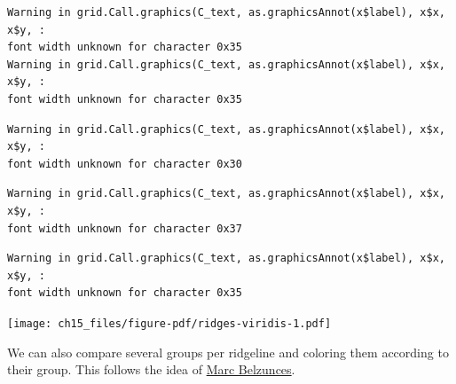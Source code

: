 \documentclass[
  letterpaper,
]{scrbook}
\begin{document}
\begin{verbatim}
Warning in grid.Call.graphics(C_text, as.graphicsAnnot(x$label), x$x, x$y, :
font width unknown for character 0x35
Warning in grid.Call.graphics(C_text, as.graphicsAnnot(x$label), x$x, x$y, :
font width unknown for character 0x35
\end{verbatim}

\begin{verbatim}
Warning in grid.Call.graphics(C_text, as.graphicsAnnot(x$label), x$x, x$y, :
font width unknown for character 0x30
\end{verbatim}

\begin{verbatim}
Warning in grid.Call.graphics(C_text, as.graphicsAnnot(x$label), x$x, x$y, :
font width unknown for character 0x37
\end{verbatim}

\begin{verbatim}
Warning in grid.Call.graphics(C_text, as.graphicsAnnot(x$label), x$x, x$y, :
font width unknown for character 0x35
\end{verbatim}

\texttt{[image: ch15\_files/figure-pdf/ridges-viridis-1.pdf]}

We can also compare several groups per ridgeline and coloring them
according to their group. This follows the idea of
\href{https://twitter.com/marcbeldata/status/888697140268204032}{Marc
Belzunces}.
\end{document}
